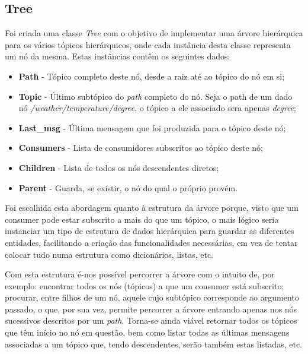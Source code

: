 \documentclass[10pt,portuguese]{article}
\begin{document}
\subsection{Tree}
Foi criada uma classe \textit{Tree} com o objetivo de implementar uma árvore hierárquica para os vários tópicos hierárquicos, onde cada instância desta classe representa um nó da mesma. Estas instâncias contêm os seguintes dados:
\begin{itemize}

 \item \textbf{Path} - Tópico completo deste nó, desde a raiz até ao tópico do nó em si;
 
 \item \textbf{Topic} - Último subtópico do \textit{path} completo do nó. Seja o path de um dado nó \textit{/weather/temperature/degree}, o tópico a ele associado sera apenas \textit{degree};
 
\item \textbf{Last\_msg} - Última mensagem que foi produzida para o tópico deste nó;

\item \textbf{Consumers} - Lista de consumidores subscritos ao tópico deste nó; 

\item \textbf{Children} - Lista de todos os nós descendentes diretos;

\item \textbf{Parent} - Guarda, se existir, o nó do qual o próprio provém.

\end{itemize}

\par Foi escolhida esta abordagem quanto à estrutura da árvore porque, visto que um consumer pode estar subscrito a mais do que um tópico, o mais lógico seria instanciar um tipo de estrutura de dados hierárquica para guardar as diferentes entidades, facilitando a criação das funcionalidades necessárias, em vez de tentar colocar tudo numa estrutura como dicionários, listas, etc.

\par Com esta estrutura é-nos possível percorrer a árvore com o intuito de, por exemplo: encontrar todos os nós (tópicos) a que um consumer está subscrito; procurar, entre filhos de um nó, aquele cujo subtópico corresponde ao argumento passado, o que, por sua vez, permite percorrer a árvore entrando apenas nos nós sucessivos descritos por um \textit{path}. Torna-se ainda viável retornar todos os tópicos que têm início no nó em questão, bem como listar todas as últimas mensagens associadas a um tópico que, tendo descendentes, serão também estas listadas, etc.
\end{document}
